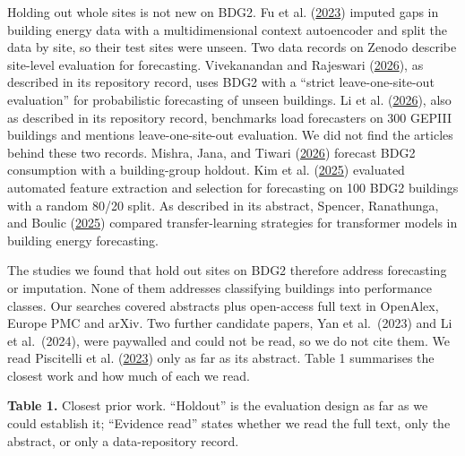 \documentclass[
  10pt,
]{article}
\begin{document}
Holding out whole sites is not new on BDG2. Fu et al.
(\protect\hyperlink{ref-fu2023}{2023}) imputed gaps in building energy
data with a multidimensional context autoencoder and split the data by
site, so their test sites were unseen. Two data records on Zenodo
describe site-level evaluation for forecasting. Vivekanandan and
Rajeswari (\protect\hyperlink{ref-vivekanandan2026}{2026}), as described
in its repository record, uses BDG2 with a ``strict leave-one-site-out
evaluation'' for probabilistic forecasting of unseen buildings. Li et
al. (\protect\hyperlink{ref-li2026}{2026}), also as described in its
repository record, benchmarks load forecasters on 300 GEPIII buildings
and mentions leave-one-site-out evaluation. We did not find the articles
behind these two records. Mishra, Jana, and Tiwari
(\protect\hyperlink{ref-mishra2026}{2026}) forecast BDG2 consumption
with a building-group holdout. Kim et al.
(\protect\hyperlink{ref-kim2025}{2025}) evaluated automated feature
extraction and selection for forecasting on 100 BDG2 buildings with a
random 80/20 split. As described in its abstract, Spencer, Ranathunga,
and Boulic (\protect\hyperlink{ref-spencer2025}{2025}) compared
transfer-learning strategies for transformer models in building energy
forecasting.

The studies we found that hold out sites on BDG2 therefore address
forecasting or imputation. None of them addresses classifying buildings
into performance classes. Our searches covered abstracts plus
open-access full text in OpenAlex, Europe PMC and arXiv. Two further
candidate papers, Yan et al.~(2023) and Li et al.~(2024), were paywalled
and could not be read, so we do not cite them. We read Piscitelli et al.
(\protect\hyperlink{ref-piscitelli2023}{2023}) only as far as its
abstract. Table 1 summarises the closest work and how much of each we
read.

\textbf{Table 1.} Closest prior work. ``Holdout'' is the evaluation
design as far as we could establish it; ``Evidence read'' states whether
we read the full text, only the abstract, or only a data-repository
record.
\end{document}
